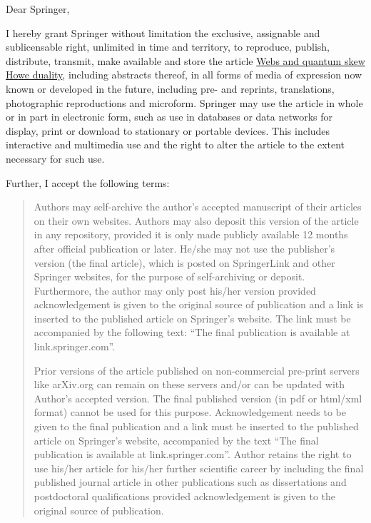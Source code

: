 \documentclass[10pt]{scrlttr2}
\begin{document}
\begin{letter}{\hspace{1cm}
}

\opening{Dear Springer,}


I hereby grant Springer without limitation the exclusive, assignable and sublicensable right, unlimited in time and territory, to reproduce, publish, distribute, transmit, make available and store the article \href{http://dx.doi.org/10.1007/s00208-013-0984-4}{Webs and quantum skew Howe duality}, including abstracts thereof, in all forms of media of expression now known or developed in the future, including pre- and reprints, translations, photographic reproductions and microform. Springer may use the article in whole or in part in electronic form, such as use in databases or data networks for display, print or download to stationary or portable devices. This includes interactive and multimedia use and the right to alter the article to the extent necessary for such use.

Further, I accept the following terms:

\begin{quote}
Authors may self-archive the author's accepted manuscript of their articles on their own websites. Authors may also deposit this version of the article in any repository, provided it is only made publicly available 12 months after official publication or later. He/she may not use the publisher's version (the final article), which is posted on SpringerLink and other Springer websites, for the purpose of self-archiving or deposit. Furthermore, the author may only post his/her version provided acknowledgement is given to the original source of publication and a link is inserted to the published article on Springer's website. The link must be accompanied by the following text: ``The final publication is available at
link.springer.com''.

Prior versions of the article published on non-commercial pre-print servers like arXiv.org can remain on these servers and/or can be updated with Author's accepted version. The final published version (in pdf or html/xml format) cannot be used for this purpose. Acknowledgement needs to be given to the final publication and a link must be inserted to the published article on Springer's website, accompanied by the text ``The final publication is available at link.springer.com''. Author retains the right to use his/her article for his/her further scientific career by including the final published journal article in other publications such as dissertations and postdoctoral qualifications provided acknowledgement is given to the original source of publication.


\end{quote}
\end{letter}
\end{document}

